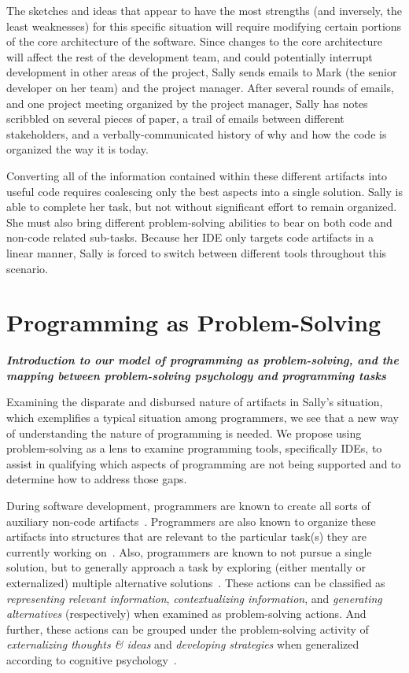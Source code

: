 \documentclass{ppig}
\newcommand{\bold}[1]{\textit{\textbf{\color{aoblue}#1}}}
\begin{document}
The sketches and ideas that appear to have the most strengths (and inversely, the least weaknesses) for this specific situation will require modifying certain portions of the core architecture of the software.
Since changes to the core architecture will affect the rest of the development team, and could potentially interrupt development in other areas of the project, Sally sends emails to Mark (the senior developer on her team) and the project manager.
After several rounds of emails, and one project meeting organized by the project manager, Sally has notes scribbled on several pieces of paper, a trail of emails between different stakeholders, and a verbally-communicated history of why and how the code is organized the way it is today.

Converting all of the information contained within these different artifacts into useful code requires coalescing only the best aspects into a single solution.
Sally is able to complete her task, but not without significant effort to remain organized.
She must also bring different problem-solving abilities to bear on both code and non-code related sub-tasks.
Because her IDE only targets code artifacts in a linear manner, Sally is forced to switch between different tools throughout this scenario.

\section{Programming as Problem-Solving}

\bold{Introduction to our model of programming as problem-solving, and the mapping between problem-solving psychology and programming tasks\\}

Examining the disparate and disbursed nature of artifacts in Sally's situation, which exemplifies a typical situation among programmers, we see that a new way of understanding the nature of programming is needed.
We propose using problem-solving as a lens to examine programming tools, specifically IDEs, to assist in qualifying which aspects of programming are not being supported and to determine how to address those gaps.

During software development, programmers are known to create all sorts of auxiliary non-code artifacts~\cite{cherubini2007whiteboard}.
Programmers are also known to organize these artifacts into structures that are relevant to the particular task(s) they are currently working on~\cite{baltes2016empirical}.
Also, programmers are known to not pursue a single solution, but to generally approach a task by exploring (either mentally or externalized) multiple alternative solutions~\cite{madeyski2017experimentation}.
These actions can be classified as \textit{representing relevant information}, \textit{contextualizing information}, and \textit{generating alternatives} (respectively) when examined as problem-solving actions.
And further, these actions can be grouped under the problem-solving activity of \textit{externalizing thoughts \& ideas} and \textit{developing strategies} when generalized according to cognitive psychology~\cite{mayer1992thinking}.
\end{document}
